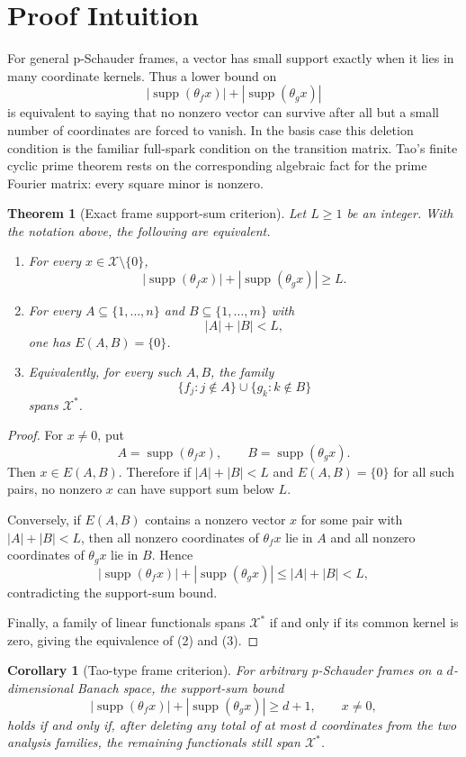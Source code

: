 \documentclass[11pt]{article}
\newtheorem{theorem}{Theorem}
\newtheorem{corollary}{Corollary}
\newcommand{\X}{\mathcal X}
\newcommand{\supp}{\operatorname{supp}}
\begin{document}
\section*{Proof Intuition}

For general p-Schauder frames, a vector has small support exactly when it lies in many coordinate kernels. Thus a lower bound on
\[
|\supp(\theta_f x)|+|\supp(\theta_g x)|
\]
is equivalent to saying that no nonzero vector can survive after all but a small number of coordinates are forced to vanish. In the basis case this deletion condition is the familiar full-spark condition on the transition matrix. Tao's finite cyclic prime theorem rests on the corresponding algebraic fact for the prime Fourier matrix: every square minor is nonzero.

\begin{theorem}[Exact frame support-sum criterion]
Let $L\ge 1$ be an integer. With the notation above, the following are equivalent.
\begin{enumerate}
\item For every $x\in \X\setminus\{0\}$,
\[
|\supp(\theta_f x)|+|\supp(\theta_g x)|\ge L.
\]
\item For every $A\subseteq\{1,\dots,n\}$ and $B\subseteq\{1,\dots,m\}$ with
\[
|A|+|B|<L,
\]
one has $E(A,B)=\{0\}$.
\item Equivalently, for every such $A,B$, the family
\[
\{f_j:j\notin A\}\cup \{g_k:k\notin B\}
\]
spans $\X^*$.
\end{enumerate}
\end{theorem}

\begin{proof}
For $x\ne0$, put
\[
A=\supp(\theta_f x),\qquad B=\supp(\theta_g x).
\]
Then $x\in E(A,B)$. Therefore if $|A|+|B|<L$ and $E(A,B)=\{0\}$ for all such pairs, no nonzero $x$ can have support sum below $L$.

Conversely, if $E(A,B)$ contains a nonzero vector $x$ for some pair with $|A|+|B|<L$, then all nonzero coordinates of $\theta_f x$ lie in $A$ and all nonzero coordinates of $\theta_g x$ lie in $B$. Hence
\[
|\supp(\theta_f x)|+|\supp(\theta_g x)|\le |A|+|B|<L,
\]
contradicting the support-sum bound.

Finally, a family of linear functionals spans $\X^*$ if and only if its common kernel is zero, giving the equivalence of (2) and (3).
\end{proof}

\begin{corollary}[Tao-type frame criterion]
For arbitrary p-Schauder frames on a $d$-dimensional Banach space, the support-sum bound
\[
|\supp(\theta_f x)|+|\supp(\theta_g x)|\ge d+1,\qquad x\ne0,
\]
holds if and only if, after deleting any total of at most $d$ coordinates from the two analysis families, the remaining functionals still span $\X^*$.
\end{corollary}
\end{document}
